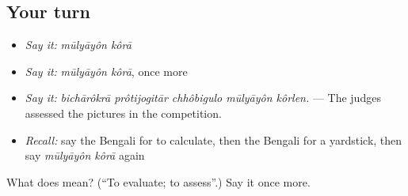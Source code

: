 \subsection*{Your turn}
\begin{itemize}
\raggedright
  \item \emph{Say it:} \emph{mūlyāyôn kôrā}
  \item \emph{Say it:} \emph{mūlyāyôn kôrā}, once more
  \item \emph{Say it:} \emph{bichārôkrā prôtijogitār chhôbigulo mūlyāyôn kôrlen.} — The judges assessed the pictures in the competition.
  \item \emph{Recall:} say the Bengali for to calculate, then the Bengali for a yardstick, then say \emph{mūlyāyôn kôrā} again
\end{itemize}

\begin{tcolorbox}[breakable,colback=teal!4,colframe=teal!35!black,title={Before you move on}]
What does   mean? (\textquotedblleft{}To evaluate; to assess\textquotedblright{}.) Say it once more.
\end{tcolorbox}
